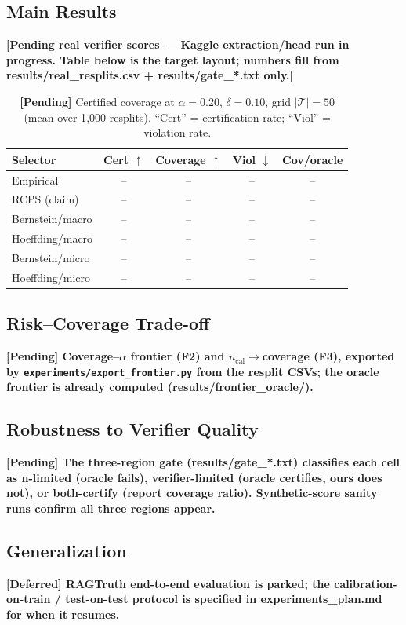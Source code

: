 \documentclass{article}
\begin{document}
\subsection{Main Results}
\textbf{[Pending real verifier scores --- Kaggle extraction/head run in
progress. Table below is the target layout; numbers fill from
results/real\_resplits.csv + results/gate\_*.txt only.]}

\begin{table}[t]
 \caption{\textbf{[Pending]} Certified coverage at $\alpha{=}0.20$,
 $\delta{=}0.10$, grid $|\mathcal{T}|{=}50$ (mean over 1{,}000 resplits).
 ``Cert'' = certification rate; ``Viol'' = violation rate.}
  \centering
  \begin{tabular}{lcccc}
    \toprule
    Selector & Cert $\uparrow$ & Coverage $\uparrow$ & Viol $\downarrow$ & Cov/oracle \\
    \midrule
    Empirical        & -- & -- & -- & -- \\
    RCPS (claim)     & -- & -- & -- & -- \\
    Bernstein/macro  & -- & -- & -- & -- \\
    Hoeffding/macro  & -- & -- & -- & -- \\
    Bernstein/micro  & -- & -- & -- & -- \\
    Hoeffding/micro  & -- & -- & -- & -- \\
    \bottomrule
  \end{tabular}
  \label{tab:main}
\end{table}

\subsection{Risk--Coverage Trade-off}
\textbf{[Pending] Coverage--$\alpha$ frontier (F2) and
$n_{\mathrm{cal}}\to$coverage (F3), exported by
\texttt{experiments/export\_frontier.py} from the resplit CSVs; the
oracle frontier is already computed (results/frontier\_oracle/).}

\subsection{Robustness to Verifier Quality}
\textbf{[Pending] The three-region gate (results/gate\_*.txt) classifies
each cell as n-limited (oracle fails), verifier-limited (oracle
certifies, ours does not), or both-certify (report coverage ratio).
Synthetic-score sanity runs confirm all three regions appear.}

\subsection{Generalization}
\textbf{[Deferred] RAGTruth end-to-end evaluation is parked; the
calibration-on-train / test-on-test protocol is specified in
experiments\_plan.md for when it resumes.}
\end{document}
